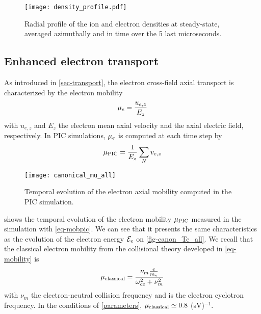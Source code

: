   \begin{figure}[hbt]
    \centering
    \texttt{[image: density\_profile.pdf]}
    \caption{Radial profile of the ion and electron densities at steady-state, averaged azimuthally and in time over the 5 last microseconds.}
    \label{fig-profiles}
  \end{figure}
  
  \subsection{Enhanced electron transport} \label{subsec-canonmue}
  As introduced in \cref{sec-transport}, the electron cross-field axial transport is characterized by the electron mobility
  \begin{equation} \label{eq-mobdef}
    \mu_e = \frac{u_{e, z}}{E_z}
  \end{equation}
  with $u_{e,z}$ and $E_z$ the electron mean axial velocity and the axial electric field, respectively.
  In \ac{PIC} simulations, $\mu_e$ is computed at each time step by
  \begin{equation} \label{eq-mobpic}
    \mu_{\mathrm{PIC}} = \frac{1}{E_z} \sum_N v_{e,z}
  \end{equation}

  \begin{figure}[hbt]
    \centering
    \texttt{[image: canonical\_mu\_all]}
    \caption{Temporal evolution of the electron axial mobility computed in the \acs{PIC} simulation.}
    \label{fig-canon_mu}
  \end{figure}
  
   shows the temporal evolution of the electron mobility $\mu_{\mathrm{PIC}}$ measured in the simulation with \cref{eq-mobpic}.
  We can see that it presents the same characteristics as the evolution of the electron energy ${\mathcal{E}_e}$ on \cref{fig-canon_Te_all}.
  We recall that the classical electron mobility from the collisional theory developed in \cref{eq-mobility} is \citep{lafleur2016a}
  \begin{equation} \label{eq-muclass}
    \mu_{\mathrm{classical}} = \frac{\nu_m \frac{e}{m_e}}{\omega_{ce}^2 + \nu_m^2}
  \end{equation}
  with $\nu_m$ the electron-neutral  collision frequency and \oce is the electron cyclotron frequency.
  In the conditions of \cref{parameters}, $\mu_{\mathrm{classical}} \simeq 0.8$ \square\meter(sV)$^{-1}$.
  
